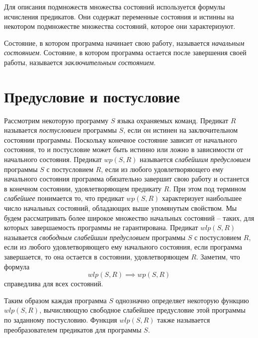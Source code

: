 Для описания подмножеств множества состояний используется формулы исчисления предикатов. Они содержат
переменные состояния и истинны на некотором подмножестве множества состояний, которое они характеризуют.

Состояние, в котором программа начинает свою работу, называется \textit{начальным состоянием}. Состояние, 
в котором программа остается после завершения своей работы, называется \textit{заключительным состоянием}.



\section{Предусловие и постусловие}
Рассмотрим некоторую программу $S$ языка охраняемых команд. Предикат $R$ называется \textit{постусловием} программы $S$,
если он истинен на заключительном состоянии программы. Поскольку конечное состояние зависит от начального состояния, то 
и постусловие может быть истинно или ложно в зависимости от начального состояния. Предикат $wp(S, R)$ называется
\textit{слабейшим предусловием} программы $S$ с постусловием $R$, если из любого удовлетворяющего ему начального состояния
программа обязательно завершит свою работу и останется в конечном состоянии, удовлетворяющем предикату $R$. При этом
под термином \textit{слабейшее} понимается то, что предикат $wp(S, R)$ характеризует наибольшее число начальных состояний,
обладающих выше упомянутым свойством. Мы будем рассматривать более широкое множество начальных состояний 
-- таких, для которых завершаемость программы не гарантирована.
Предикат $wlp(S, R)$ называется
\textit{свободным слабейшим предусловием} программы $S$ с постусловием $R$, если из любого удовлетворяющего ему начального состояния,
если программа завершается, то она остается в состоянии, удовлетворяющем $R$. Заметим, что формула 
\begin{equation}
	wlp(S, R) \implies wp(S, R)
\end{equation}
справедлива для всех состояний.

Таким образом каждая программа $S$ однозначно определяет некоторую функцию $wlp(S, R)$,
вычисляющую свободное слабейшее предусловие этой программы по заданному постусловию. Функция $wlp(S, R)$ также
называется преобразователем предикатов для программы $S$.

